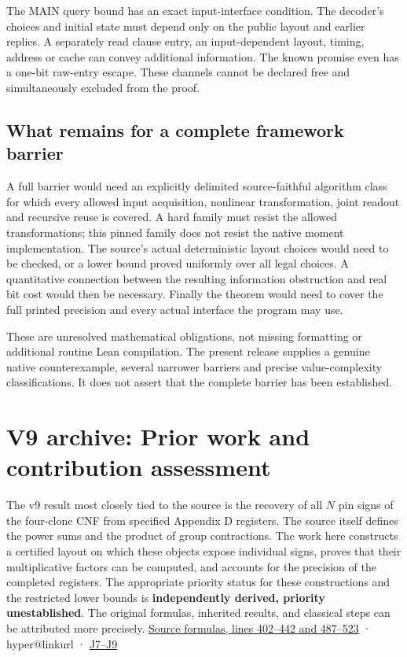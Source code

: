 \documentclass[11pt,a4paper]{article}
\makeatletter
\newcommand{\PaperSixCatalogue}[1]{\csname hyper@linkurl\endcsname{#1}{EVIDENCE_CATALOG.md}}
\newcommand{\PaperSixEvidence}[2]{\PaperSixCatalogue{#2}}
\makeatother
\begin{document}
The MAIN query bound has an exact input-interface condition. The
decoder's choices and initial state must depend only on the public
layout and earlier replies. A separately read clause entry, an
input-dependent layout, timing, address or cache can convey additional
information. The known promise even has a one-bit raw-entry escape.
These channels cannot be declared free and simultaneously excluded from
the proof.

\subsection{What remains for a complete framework
barrier}\label{v9-what-remains-for-a-complete-framework-barrier}

A full barrier would need an explicitly delimited source-faithful
algorithm class for which every allowed input acquisition, nonlinear
transformation, joint readout and recursive reuse is covered. A hard
family must resist the allowed transformations; this pinned family does
not resist the native moment implementation. The source's actual
deterministic layout choices would need to be checked, or a lower bound
proved uniformly over all legal choices. A quantitative connection
between the resulting information obstruction and real bit cost would
then be necessary. Finally the theorem would need to cover the full
printed precision and every actual interface the program may use.

These are unresolved mathematical obligations, not missing formatting or
additional routine Lean compilation. The present release supplies a
genuine native counterexample, several narrower barriers and precise
value-complexity classifications. It does not assert that the complete
barrier has been established.

\section{V9 archive: Prior work and contribution assessment}\label{v9-section-contribution-audit}

The v9 result most closely tied to the source is the recovery of all
\(N\) pin signs of the four-clone CNF from specified Appendix D
registers. The source itself defines the power sums and the product of
group contractions. The work here constructs a certified layout on which
these objects expose individual signs, proves that their multiplicative
factors can be computed, and accounts for the precision of the completed
registers. The appropriate priority status for these constructions and
the restricted lower bounds is \textbf{independently derived, priority
unestablished}. The original formulas, inherited results, and classical
steps can be attributed more precisely.
\href{https://github.com/openai/math/blob/main/preprints/The-Exponential-Time-Hypothesis-is-False-October-25-2026/build/quantitative-contraction.tex\#L402}{Source
formulas, lines 402--442 and 487--523} ·
\PaperSixEvidence{evidence/research_v7/reviews/hybrid_independent.md}{v7 pinned family}
· \hyperref[v9-section-moment-escape]{J7--J9}
\end{document}
